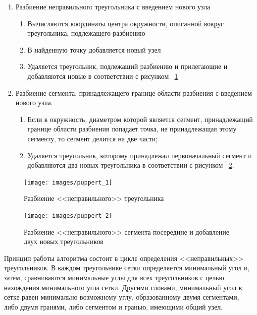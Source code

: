 \documentclass[14pt]{extreport}
\begin{document}
\begin{enumerate}

\item Разбиение неправильного треугольника с введением нового узла

\begin{enumerate}

\item Вычисляются координаты центра окружности, описанной вокруг треугольника, подлежащего разбиению

\item В найденную точку добавляется новый узел

\item Удаляется треугольник, подлежащий разбиению и прилегающие и добавляются новые в соответствии с рисунком ~\ref{img:triangle:1}

\end{enumerate}

\item Разбиение сегмента, принадлежащего границе области разбиения с введением нового узла. 

\begin{enumerate}

\item Если в окружность, диаметром которой является сегмент, принадлежащий границе области разбиения попадает точка, не принадлежащая этому сегменту, то сегмент делится на две части;

\item Удаляется треугольник, которому принадлежал первоначальный сегмент и добавляются два новых треугольника в соответствии с рисунком ~\ref{img:triangle:2}.

\end{enumerate}
\end{enumerate}

\begin{figure}[H]
\centerline{\texttt{[image: images/puppert\_1]}}
\caption{Разбиение <<неправильного>> треугольника}
\label{img:triangle:1}
\end{figure}


\begin{figure}[H]
\centerline{\texttt{[image: images/puppert\_2]}}
\caption{Разбиение <<неправильного>> сегмента посередине и добавление двух новых треугольников}
\label{img:triangle:2}
\end{figure}


Принцип работы алгоритма состоит в цикле определения <<неправильных>> треугольников. В каждом треугольнике сетки определяется минимальный угол и, затем, сравниваются минимальные углы для всех треугольников с целью нахождения минимального угла сетки. Другими словами, минимальный угол в сетке равен минимально возможному углу, образованному двумя сегментами, либо двумя гранями, либо сегментом и гранью, имеющими общий узел.
\end{document}

